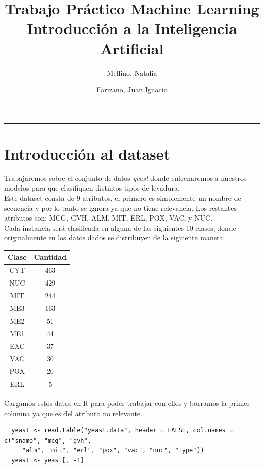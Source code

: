 \documentclass[11pt]{article}
\title{
    Trabajo Práctico Machine Learning \\
    \large Introducción a la Inteligencia Artificial}
\author{Mellino, Natalia \and Farizano, Juan Ignacio}
\date{}
\begin{document}
\maketitle

\noindent\rule{\textwidth}{1pt}

\section*{Introducción al dataset}

Trabajaremos sobre el conjunto de datos \emph{yeast} donde entrenaremos
a nuestros modelos para que clasifiquen distintos tipos de levadura. \\

Este dataset consta de 9 atributos, el primero es simplemente un nombre de
secuencia y por lo tanto se ignora ya que no tiene relevancia.
Los restantes atributos son: MCG, GVH, ALM, MIT, ERL, POX, VAC, y NUC. \\

Cada instancia será clasificada en alguna de las siguientes 10 clases, donde 
originalmente en los datos dados se distribuyen de la siguiente manera: 

\begin{table}[h!]
  \begin{center}
    \begin{tabular}{|c|c|}
      \hline
      Clase     & Cantidad     \\ \hline
      CYT       & 463          \\ \hline
      NUC       & 429          \\ \hline
      MIT       & 244          \\ \hline
      ME3       & 163          \\ \hline
      ME2       & 51           \\ \hline
      ME1       & 44           \\ \hline
      EXC       & 37           \\ \hline
      VAC       & 30           \\ \hline
      POX       & 20           \\ \hline
      ERL       & 5            \\ \hline
    \end{tabular}
  \end{center}
\end{table}

Cargamos estos datos en R para poder trabajar con ellos y borramos la primer
columna ya que es del atributo no relevante.
\begin{verbatim}
  yeast <- read.table("yeast.data", header = FALSE, col.names = c("sname", "mcg", "gvh",
     "alm", "mit", "erl", "pox", "vac", "nuc", "type"))
  yeast <- yeast[, -1]
\end{verbatim}
\end{document}
